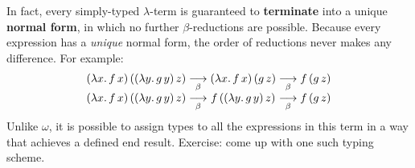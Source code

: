 \documentclass{article}
\begin{document}
In fact, every simply-typed $\lambda$-term is guaranteed to \textbf{terminate}
into a unique \textbf{normal form}, in which no further $\beta$-reductions are
possible. Because every expression has a \emph{unique} normal form, the order of
reductions never makes any difference. For example:
\begin{align}
  \begin{array}{r@{}c@{}l}
    (\lambda x.\, f\,x) \, ((\lambda y.\, g\, y)\, z)
    \underset{\beta}\longrightarrow{}
    &
    (\lambda x.\, f\,x) \, (g\,z)
    &
    {}\underset{\beta}\longrightarrow f\, (g\, z)
    \\
    (\lambda x.\, f\,x) \, ((\lambda y.\, g\, y)\, z)
    \underset{\beta}\longrightarrow{}
    &
    f\,((\lambda y.\, g\, y)\, z)
    &
    {}\underset{\beta}\longrightarrow  
    f\, (g\, z)
  \end{array}
\end{align}
%
Unlike $\omega$, it is possible to assign types to all the expressions in this
term in a way that achieves a defined end result. Exercise: come up with one
such typing scheme. 
\end{document}
